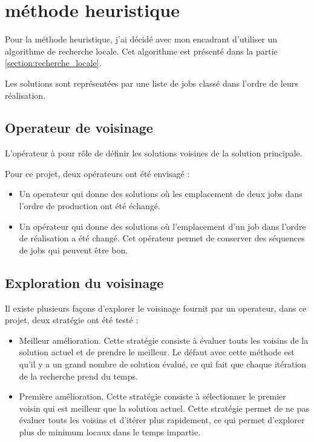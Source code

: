 

\section{méthode heuristique}
\label{section:analyse:methode_heuristique}

Pour la méthode heuristique, j'ai décidé avec mon encadrant d'utiliser un algorithme de recherche locale.
Cet algorithme est présenté dans la partie \autoref{section:recherche_locale}.
	
Les solutions sont représentées par une liste de jobs classé dans l'ordre de leurs réalisation.

\subsection{Operateur de voisinage}

L'opérateur à pour rôle de définir les solutions voisines de la solution principale.

Pour ce projet, deux opérateurs ont été envisagé :

\begin{itemize}
	\item Un operateur qui donne des solutions où les emplacement de deux jobs dans l'ordre de production ont été échangé.
	\item Un opérateur qui donne des solutions où l'emplacement d'un job dans l'ordre de réalisation a été changé.
	Cet opérateur permet de conserver des séquences de jobs qui peuvent être bon.
\end{itemize}

\subsection{Exploration du voisinage}

Il existe plusieurs façons d'explorer le voisinage fournit par un operateur, dans ce projet, deux stratégie ont été testé :
\begin{itemize}
	\item Meilleur amélioration.
	Cette stratégie consiste à évaluer touts les voisins de la solution actuel et de prendre le meilleur.
	Le défaut avec cette méthode est qu'il y a un grand nombre de solution évalué, ce qui fait que chaque itération de la recherche prend du temps.
	\item Première amélioration. Cette stratégie consiste à sélectionner le premier voisin qui est meilleur que la solution actuel.
	Cette stratégie permet de ne pas évaluer touts les voisins et d'itérer plus rapidement, ce qui permet d'explorer plus de minimum locaux dans le temps impartie.
\end{itemize}


